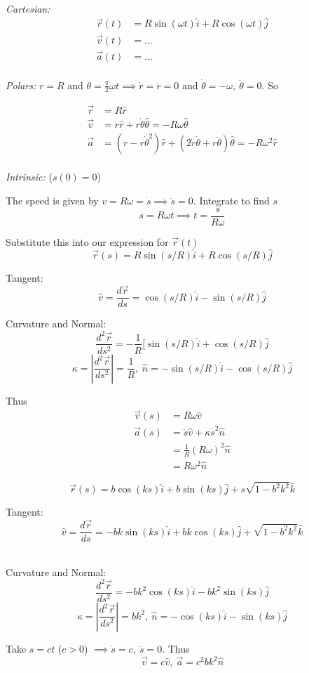 \documentclass[10pt]{scrartcl}
\begin{document}
\begin{example}~

\emph{Cartesian:}
\[\begin{aligned}
\vec{r}(t) &= R\sin(\omega t)\hat{i} + R\cos(\omega t)\hat{j}\\
\vec{v}(t) &= \dots\\
\vec{a}(t) &= \dots
\end{aligned}
\]~\\


\emph{Polars:} 
$r = R$ and $\theta = \frac{\pi}{2} \omega t \implies \dot{r} = \ddot{r} = 0$ and $ \dot{\theta} = -\omega,~\ddot{\theta} = 0$. So 

\[\begin{aligned}
	\vec{r} &= R\hat{r}\\
 \vec{v} &= \dot{r}\hat{r} + r\dot{\theta}\hat{\theta} = -R\omega\hat{\theta}\\
\vec{a} &= (\ddot{r} - r\dot{\theta}^2)\hat{r} + (2\dot{r}\dot{\theta} + r\ddot{\theta})\hat{\theta} = -R\omega^2\hat{r}
\end{aligned}
\]~\\


\emph{Intrinsic:} ($s(0) = 0$) 

The speed is given by $v = R\omega = \dot{s} \implies \ddot{s} = 0$. Integrate to find $s$
\[s = R\omega t \implies t= \frac{s}{R\omega}\]

Substitute this into our expression for $\vec{r}(t)$
\[\vec{r}(s) = R\sin(s/R)\hat{i} + R\cos(s/R)\hat{j}\]

Tangent: 
\[\hat{v} = \dfrac{d\vec{r}}{ds} = \cos(s/R)\hat{i} - \sin(s/R)\hat{j}\]

Curvature and Normal:
\[\dfrac{d^2\vec{r}}{ds^2} = -\dfrac{1}{R}[\sin(s/R)\hat{i} + \cos(s/R)\hat{j}\]
\[ \kappa = \left|\dfrac{d^2\vec{r}}{ds^2} \right| = \dfrac{1}{R},~ \hat{n} = -\sin(s/R)\hat{i} - \cos(s/R)\hat{j}\]

Thus
\[\begin{aligned}
\vec{v}(s) &= R\omega \hat{v}\\
\vec{a}(s) &= \ddot{s}\hat{v} + \kappa \dot{s}^2\hat{n}\\
& = \frac{1}{R}(R\omega)^2\hat{n}\\ &= R\omega^2\hat{n}
\end{aligned}
\]
\end{example}

\pagebreak


\begin{example}
	\[\vec{r}(s) = b\cos(ks)\hat{i} + b\sin(ks)\hat{j} + s\sqrt{1-b^2k^2}\hat{k}\]
	
	Tangent:
	\[\hat{v} = \frac{d\vec{r}}{ds} = -bk\sin(ks)\hat{i} + bk\cos(ks)\hat{j} + \sqrt{1-b^2k^2}\hat{k}\]~
	
	Curvature and Normal:
	\[\frac{d^2\vec{r}}{ds^2} = -bk^2\cos(ks)\hat{i} -bk^2 \sin(ks)\hat{j}\]
	\[\kappa =\left|\frac{d^2\vec{r}}{ds^2}\right| = bk^2,~ \hat{n} =  -\cos(ks)\hat{i} -\sin(ks)\hat{j}\]
	
Take $s = ct$ ($c >0$) $ \implies \dot{s} =c,~ \ddot{s} = 0$. Thus
\[\vec{v} = c\hat{v},~\vec{a} = c^2bk^2\hat{n}\]	
\end{example}~
\end{document}
